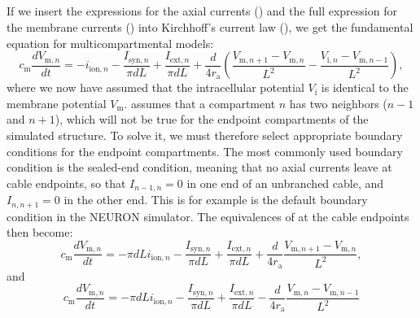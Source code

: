\subsection{}
\label{sec:Neuron:Active_multicomp}
If we insert the expressions for the axial currents () and the full expression for the membrane currents () into Kirchhoff's current law (), we get the fundamental equation for multicompartmental models:
\begin{equation}
c_\text{m} \frac{dV_{\mathrm{m},n}}{dt} = -i_{\mathrm{ion},n} - \frac{I_{\mathrm{syn},n}}{\pi d L} +  \frac{I_{\mathrm{ext},n}}{\pi d L} + \frac{d}{4r_\text{a}}\left(\frac{V_{\mathrm{m},n+1}-V_{\mathrm{m},n}}{L^2} - \frac{V_{\mathrm{i},n}-V_{\mathrm{m},n-1}}{L^2} \right),
\label{eq:Neuron:multimain}
\end{equation}
where we now have assumed that the intracellular potential $V_{\mathrm{i}}$ is identical to the membrane potential  $V_{\mathrm{m}}$.  assumes that a compartment $n$ has two neighbors ($n-1$ and $n+1$), which will not be true for the endpoint compartments of the simulated structure. To solve it, we must therefore select appropriate boundary conditions for the endpoint compartments. The most commonly used boundary condition is the sealed-end condition, meaning that no axial currents leave at cable endpoints, so that $I_{n-1,n} = 0$ in one end of an unbranched cable, and $I_{n,n+1} =0$ in the other end. This is for example is the default boundary condition in the NEURON simulator. The equivalences of  at the cable endpoints then become:
\begin{equation}
c_\text{m} \frac{dV_{\mathrm{m},n}}{dt} = - \pi d L i_{\mathrm{ion},n} - \frac{I_{\mathrm{syn},n}}{\pi d L} +  \frac{I_{\mathrm{ext},n}}{\pi d L}  
+ \frac{d}{4 r_\text{a}} \frac{V_{\mathrm{m},n+1}-V_{\mathrm{m},n}}{L^2},
\label{eq:Neuron:multimainEND1}
\end{equation}
and
\begin{equation}
c_\text{m} \frac{dV_{\mathrm{m},n}}{dt} = - \pi d L i_{\mathrm{ion},n} - \frac{I_{\mathrm{syn},n}}{\pi d L} +  \frac{I_{\mathrm{ext},n}}{\pi d L}  
- \frac{d}{4 r_\text{a}} \frac{V_{\mathrm{m},n}-V_{\mathrm{m},n-1}}{L^2}  
\label{eq:Neuron:multimainEND2}
\end{equation}
 

